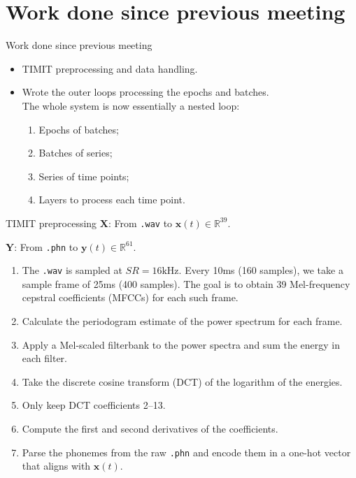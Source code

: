 \documentclass[t]{beamer}
\begin{document}
\section{Work done since previous meeting}
\begin{frame}{Work done since previous meeting}
	\begin{itemize}[label=--]
	\item TIMIT preprocessing and data handling.
	\item Wrote the outer loops processing the epochs and batches.\\
	The whole system is now essentially a nested loop:
	\begin{enumerate}[label=(\arabic*)]
	\item Epochs of batches;
	\item Batches of series;
	\item Series of time points;
	\item Layers to process each time point.
	\end{enumerate}
	\end{itemize}
\end{frame}

\begin{frame}{TIMIT preprocessing}
	$\mathbf{X}$: From \texttt{.wav} to $\mathbf{x}(t) \in \mathbb{R}^{39}$.
	
	$\mathbf{Y}$: From \texttt{.phn} to $\mathbf{y}(t) \in \mathbb{R}^{61}$.
	\begin{enumerate}[label=(\arabic*)]
	\item The \texttt{.wav} is sampled at $SR = 16 \text{kHz}$. Every 10ms (160 samples), we take a sample frame of 25ms (400 samples). The goal is to obtain 39 Mel-frequency cepstral coefficients (MFCCs) for each such frame.
	\item Calculate the periodogram estimate of the power spectrum for each frame.
	\item Apply a Mel-scaled filterbank to the power spectra and sum the energy in each filter.
	\item Take the discrete cosine transform  (DCT) of the logarithm of the energies.
	\item Only keep DCT coefficients 2--13.
	\item Compute the first and second derivatives of the coefficients.
	\item Parse the phonemes from the raw \texttt{.phn} and encode them in a one-hot vector that aligns with $\mathbf{x}(t)$.
	\end{enumerate}
\end{frame}
\end{document}
